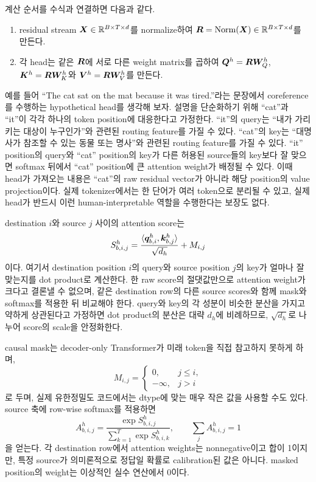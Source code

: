 계산 순서를 수식과 연결하면 다음과 같다.

\begin{enumerate}
  \item residual stream $\bm{X}\in\mathbb{R}^{B\times T\times d}$를 normalize하여 $\bm{R}=\operatorname{Norm}(\bm{X})\in\mathbb{R}^{B\times T\times d}$를 만든다.
  \item 각 head는 같은 $\bm{R}$에 서로 다른 weight matrix를 곱하여 $\bm{Q}^{h}=\bm{R}\bm{W}^{h}_{Q}$, $\bm{K}^{h}=\bm{R}\bm{W}^{h}_{K}$와 $\bm{V}^{h}=\bm{R}\bm{W}^{h}_{V}$를 만든다.
\end{enumerate}

예를 들어 ``The cat sat on the mat because it was tired.''라는 문장에서 coreference를 수행하는 hypothetical head를 생각해 보자.
설명을 단순화하기 위해 ``cat''과 ``it''이 각각 하나의 token position에 대응한다고 가정한다.
``it''의 query는 ``내가 가리키는 대상이 누구인가''와 관련된 routing feature를 가질 수 있다.
``cat''의 key는 ``대명사가 참조할 수 있는 동물 또는 명사''와 관련된 routing feature를 가질 수 있다.
``it'' position의 query와 ``cat'' position의 key가 다른 허용된 source들의 key보다 잘 맞으면 softmax 뒤에서 ``cat'' position에 큰 attention weight가 배정될 수 있다.
이때 head가 가져오는 내용은 ``cat''의 raw residual vector가 아니라 해당 position의 value projection이다.
실제 tokenizer에서는 한 단어가 여러 token으로 분리될 수 있고, 실제 head가 반드시 이런 human-interpretable 역할을 수행한다는 보장도 없다.

destination $i$와 source $j$ 사이의 attention score는
\begin{equation}
  S^h_{b,i,j}=
  \frac{\langle\bm{q}^{h}_{b,i},\bm{k}^{h}_{b,j}\rangle}{\sqrt{d_h}}
  +M_{i,j}
\end{equation}
이다.
여기서 destination position $i$의 query와 source position $j$의 key가 얼마나 잘 맞는지를 dot product로 계산한다.
한 raw score의 절댓값만으로 attention weight가 크다고 결론낼 수 없으며, 같은 destination row의 다른 source scores와 함께 mask와 softmax를 적용한 뒤 비교해야 한다.
query와 key의 각 성분이 비슷한 분산을 가지고 약하게 상관된다고 가정하면 dot product의 분산은 대략 $d_h$에 비례하므로, $\sqrt{d_h}$로 나누어 score의 scale을 안정화한다.

causal mask는 decoder-only Transformer가 미래 token을 직접 참고하지 못하게 하며,
\begin{equation}
  M_{i,j}=\begin{cases}
  0,&j\le i,\\
  -\infty,&j>i
  \end{cases}
\end{equation}
로 두며, 실제 유한정밀도 코드에서는 dtype에 맞는 매우 작은 값을 사용할 수도 있다.
source 축에 row-wise softmax를 적용하면
\begin{equation}
  A^h_{b,i,j}=\frac{\exp S^h_{b,i,j}}
  {\sum_{k=1}^{T}\exp S^h_{b,i,k}},
  \qquad \sum_j A^h_{b,i,j}=1
\end{equation}
을 얻는다.
각 destination row에서 attention weights는 nonnegative이고 합이 1이지만, 특정 source가 의미론적으로 정답일 확률로 calibration된 값은 아니다.
masked position의 weight는 이상적인 실수 연산에서 0이다.

